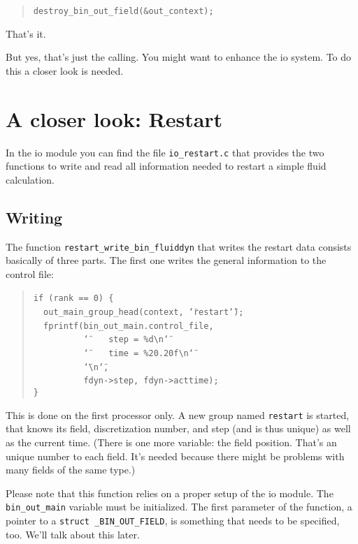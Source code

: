 \begin{quote}
\texttt{destroy{\_}bin{\_}out{\_}field({\&}out{\_}context); }
\end{quote}
That's it.

But yes, that's just the calling. You might want to enhance the io
system. To do this a closer look is needed.


\section{A closer look: Restart}

In the io module you can find the file \texttt{io{\_}restart.c}
that provides the two functions to write and read all information
needed to restart a simple fluid calculation.


\subsection{Writing}

The function \texttt{restart{\_}write{\_}bin{\_}fluiddyn} that
writes the restart data consists basically of three parts. The first
one writes the general information to the control file: 

\begin{quote}
\texttt{if~(rank~==~0)~{\{}~}~\\
 \texttt{~~out{\_}main{\_}group{\_}head(context,~\char`\"{}restart\char`\"{});~}~\\
 \texttt{~~fprintf(bin{\_}out{\_}main.control{\_}file,~}~\\
 \texttt{~~~~~~~~~~\char`\"{}~~~~step~=~{\%}d{\textbackslash{}}n\char`\"{}~}~\\
 \texttt{~~~~~~~~~~\char`\"{}~~~~time~=~{\%}20.20f{\textbackslash{}}n\char`\"{}~}~\\
 \texttt{~~~~~~~~~~\char`\"{}{\textbackslash{}}n\char`\"{},~}~\\
 \texttt{~~~~~~~~~~fdyn->step,~fdyn->acttime);~}~\\
 \texttt{{\}} }
\end{quote}
This is done on the first processor only. A new group named \texttt{restart}
is started, that knows its field, discretization number, and step
(and is thus unique) as well as the current time. (There is one more
variable: the field position. That's an unique number to each field.
It's needed because there might be problems with many fields of the
same type.)

Please note that this function relies on a proper setup of the io
module. The \texttt{bin{\_}out{\_}main} variable must be initialized.
The first parameter of the function, a pointer to a \texttt{struct
{\_}BIN{\_}OUT{\_}FIELD}, is something that needs to be specified,
too. We'll talk about this later.

